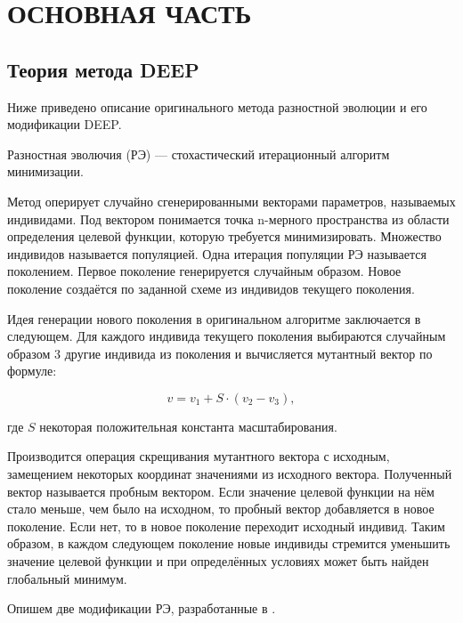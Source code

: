 \setcounter{figure}{0} \setcounter{table}{0} \setcounter{equation}{0}
\chapter*{ОСНОВНАЯ ЧАСТЬ}

\section*{Теория метода DEEP}

Ниже приведено описание оригинального метода разностной эволюции
и его модификации DEEP.

Разностная эволючия (РЭ) ---
стохастический итерационный алгоритм минимизации.

Метод оперирует случайно сгенерированными векторами параметров,
называемых индивидами. 
Под вектором понимается точка n-мерного пространства
из области определения целевой функции,
которую требуется минимизировать.
Множество индивидов называется популяцией.
Одна итерация популяции РЭ называется поколением.
Первое поколение генерируется случайным образом.
Новое поколение создаётся
по заданной схеме из индивидов текущего поколения.

Идея генерации нового поколения в оригинальном алгоритме
заключается в следующем.
Для каждого индивида текущего поколения
выбираются случайным образом 3 другие индивида
из поколения и вычисляется мутантный вектор по формуле:

\begin{equation} \label{mutant}
    v = v_1 + S \cdot (v_2 - v_3),
\end{equation}

где \begin{math}S\end{math} некоторая положительная константа масштабирования.

Производится операция скрещивания мутантного вектора с исходным,
замещением некоторых координат значениями из исходного вектора.
Полученный вектор называется пробным вектором.
Если значение целевой функции на нём стало меньше,
чем было на исходном, то пробный вектор добавляется в новое поколение.
Если нет, то в новое поколение переходит исходный индивид.
Таким образом, в каждом следующем поколение новые индивиды
стремится уменьшить значение целевой функции
и при определённых условиях может быть найден глобальный минимум.

Опишем две модификации РЭ, разработанные в \cite{KozlovThesis}.

